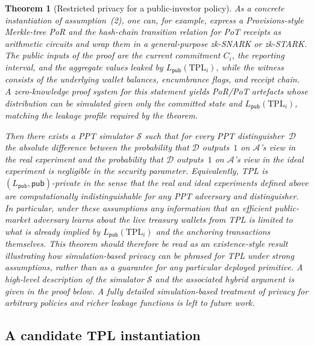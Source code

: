 \documentclass[11pt]{article}
\newtheorem{theorem}{Theorem}
\begin{document}
\begin{theorem}[Restricted privacy for a public-investor policy]
As a concrete instantiation of assumption~(2), one can, for example, express a Provisions-style Merkle-tree PoR
\cite{Dagher2015} and the hash-chain transition relation for PoT receipts as arithmetic circuits and wrap them in a
general-purpose zk-SNARK or zk-STARK.
The public inputs of the proof are the current commitment $C_i$, the reporting interval, and the aggregate values
leaked by $L_{\mathsf{pub}}(\mathrm{TPL}_i)$, while the witness consists of the underlying wallet balances, encumbrance
flags, and receipt chain.
A zero-knowledge proof system for this statement yields PoR/PoT artefacts whose distribution can be simulated given
only the committed state and $L_{\mathsf{pub}}(\mathrm{TPL}_i)$, matching the leakage profile required by the theorem.

Then there exists a PPT simulator $\mathcal{S}$ such that for every PPT distinguisher~$\mathcal{D}$ the absolute
difference between
the probability that $\mathcal{D}$ outputs~$1$ on $\mathcal{A}$'s view in the real experiment and the probability
that $\mathcal{D}$ outputs~$1$ on $\mathcal{A}$'s view in the ideal experiment is negligible in the security parameter.
Equivalently, TPL is $(L_{\mathsf{pub}}, \mathsf{pub})$-private in the sense that the real and ideal experiments defined above are
computationally indistinguishable for any PPT adversary and distinguisher.
In particular, under these assumptions any information that an efficient public-market adversary learns about the
live treasury wallets from TPL is limited to what is already implied by $L_{\mathsf{pub}}(\mathrm{TPL}_i)$ and the
anchoring transactions themselves.
This theorem should therefore be read as an existence-style result illustrating how simulation-based privacy can be phrased for TPL under strong assumptions, rather than as a guarantee for any particular deployed primitive.
A high-level description of the simulator $\mathcal{S}$ and the associated hybrid argument
is given in the proof below.
A fully detailed simulation-based treatment of privacy for arbitrary policies and richer leakage functions is left
to future work.
\end{theorem}

\subsection{A candidate TPL instantiation}
\label{sec:candidate-instantiation}
\end{document}
